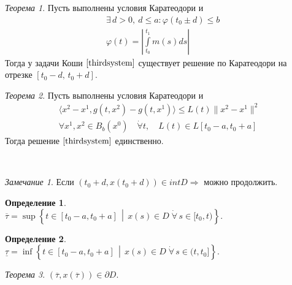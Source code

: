 \documentclass[oneside, final, 14pt, draft]{article}
\theoremstyle{definition}
\theoremstyle{definition}
\newtheorem{defin}{Определение}[section]
\theoremstyle{remark}
\newtheorem{rmk}{Замечание}[section]
\theoremstyle{theorem}
\newtheorem{thm}{Теорема}[section]
\renewcommand{\leq}{\leqslant}
\begin{document}
\begin{thm}
Пусть выполнены условия Каратеодори и 
\begin{align*}
&\exists\,d>0,\ d\leq a\colon \varphi(t_0\pm d) \leq b\\
&\varphi(t) = \left|\int\limits_{t_0}^{t_1} m(s) ds \right|
\end{align*}
Тогда у задачи Коши $\eqref{thirdsystem}$ существует решение по Каратеодори на отрезке $[t_0-d,\,t_0+d]$.
\end{thm}
\begin{thm}
Пусть выполнены условия Каратеодори и
\begin{align*}
\langle x^2 - x^1, g(t, x^2) - g(t, x^1)\rangle \leq L(t) \|x^2 - x^1\|^2\\
\forall x^1, x^2 \in B_b(x^0)\quad \dot{\forall} t,\quad L(t) \in L[t_0 - a, t_0 + a]
\end{align*}
Тогда решение $\eqref{thirdsystem}$ единственно.
\end{thm}
\ \\
\begin{rmk}
Если $(t_0 + d, x(t_0 + d)) \in int D \Rightarrow $ можно продолжить.
\end{rmk}
\begin{defin}
\ \\
    $ \overline{\tau} = \sup \left\{ t \in [t_0 - a, t_0 + a]\,\middle|\,x(s) \in D\; \dot{\forall}\,s \in [t_0, t)\right\}.$
\end{defin}
\begin{defin}
\ \\
    $ \underline{\tau} = \inf \left\{ t \in [t_0 - a, t_0 + a]\,\middle|\,x(s) \in D\; \dot{\forall}\,s \in (t, t_0]\right\}.$
\end{defin}
\begin{thm}
$
(\overline{\tau}, x(\overline{\tau})) \in \partial D.
$
\end{thm}
\end{document}
